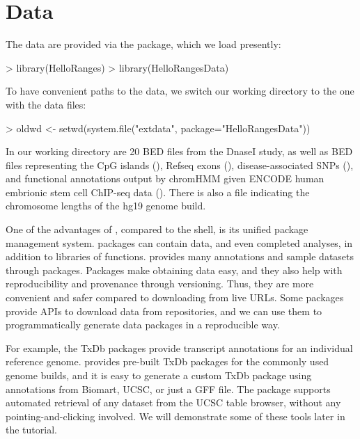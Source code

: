 \documentclass[10pt]{article}
\begin{document}
\section{Data}

The data are provided via the  package, which
we load presently:
\begin{Schunk}
\begin{Sinput}
> library(HelloRanges)
> library(HelloRangesData)
\end{Sinput}
\end{Schunk}

To have convenient paths to the data, we switch our working directory
to the one with the data files:
\begin{Schunk}
\begin{Sinput}
> oldwd <- setwd(system.file("extdata", package="HelloRangesData"))
\end{Sinput}
\end{Schunk}

In our working directory are 20 BED files from the DnaseI study, as
well as BED files representing the CpG islands (),
Refseq exons (), disease-associated SNPs
(), and functional annotations output by chromHMM given
ENCODE human embrionic stem cell ChIP-seq data
(). There is also a  file
indicating the chromosome lengths of the hg19 genome build.

One of the advantages of \R{}, compared to the shell, is its unified
package management system. \R{} packages can contain data, and even
completed analyses, in addition to libraries of
functions. \Bioconductor{} provides many annotations and sample
datasets through packages. Packages make obtaining data easy, and they
also help with reproducibility and provenance through
versioning. Thus, they are more convenient and safer compared to
downloading from live URLs. Some packages provide APIs to download
data from repositories, and we can use them to programmatically
generate data packages in a reproducible way.

For example, the TxDb packages provide transcript annotations for an
individual reference genome. \Bioconductor{} provides pre-built TxDb
packages for the commonly used genome builds, and it is easy to
generate a custom TxDb package using annotations from Biomart, UCSC,
or just a GFF file. The  package supports
automated retrieval of any dataset from the UCSC table browser,
without any pointing-and-clicking involved. We will demonstrate some
of these tools later in the tutorial.
\end{document}
